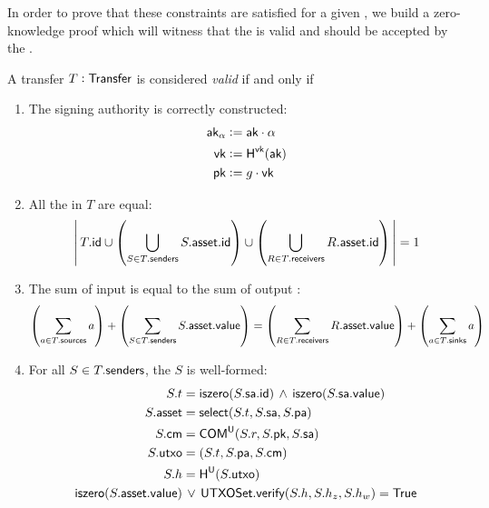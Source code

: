 In order to prove that these constraints are satisfied for a given \Transfer{}, we build a zero-knowledge proof which will witness that the \Transfer{} is valid and should be accepted by the \Ledger{}.

\begin{definition}\label{def:transfer-validity-statement}
    A transfer $T : {\textsf{Transfer}}$ is considered \emph{valid} if and only if
    \begin{enumerate}
        \item The signing authority is correctly constructed:
            \begin{align*}
                {\textsf{ak}}_\alpha &:= {\textsf{ak}} \cdot \alpha \\
                {\textsf{vk}}        &:= {\textsf{H}}^{{\textsf{vk}}}({\textsf{ak}}) \\
                {\textsf{pk}}        &:= g \cdot {\textsf{vk}}
            \end{align*}
        \item All the  in $T$ are equal:
            \[
                \left|\,
                    T.{\textsf{id}}
                    \cup
                    \left(\bigcup_{S \in T.{\textsf{senders}}} S.{\textsf{asset}}.{\textsf{id}} \right)
                    \cup
                    \left(\bigcup_{R \in T.{\textsf{receivers}}} R.{\textsf{asset}}.{\textsf{id}} \right)
                \,\right| = 1
            \]
        \item The sum of input  is equal to the sum of output :
            \[
                \left(\sum_{a \in T.{\textsf{sources}}} a\right)
                +
                \left(\sum_{S \in T.{\textsf{senders}}} S.{\textsf{asset}}.{\textsf{value}}\right)
                =
                \left(\sum_{R \in T.{\textsf{receivers}}} R.{\textsf{asset}}.{\textsf{value}}\right)
                +
                \left(\sum_{a \in T.{\textsf{sinks}}} a\right)
            \]
        \item For all $S \in T.{\textsf{senders}}$, the \Sender{} $S$ is well-formed:
            \begin{align*}
                S.t      &= \iszero(S.\sa.\ID) \,\wedge\, \iszero(S.\sa.\VALUE) \\
                S.\asset &= \select(S.t, S.\sa, S.\pa) \\
                S.\cm    &= \COM^{\U}(S.r, S.\pk, S.\sa) \\
                S.\utxo  &= (S.t, S.\pa, S.\cm) \\
                S.h      &= \HH^{\U}(S.\utxo) \\
                \iszero(S.\asset.\VALUE) &\,\vee\, \UTXOSet.\verify(S.h, S.h_z, S.h_w) = \True \\

\end{align*}
\end{enumerate}
\end{definition}
